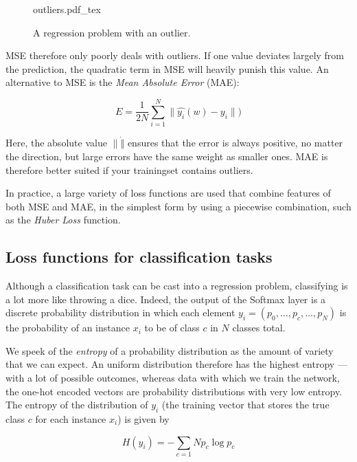 \begin{figure}[htb]
    \centering
    \def\svgwidth{0.5\textwidth}
    {outliers.pdf_tex}
    \caption{A regression problem with an outlier.\label{fig:outliers}}
\end{figure}

MSE therefore only poorly deals with outliers. If one value deviates largely from the prediction, the quadratic term in MSE will heavily punish this value. An alternative to MSE is the \emph{Mean Absolute Error} (MAE):

\begin{equation}
E=\frac{1}{2N}\sum_{i=1}^N\|\hat{y_i}(w)-y_i\|)
\end{equation}

Here, the absolute value $\|\dot\|$ ensures that the error is always positive, no matter the direction, but large errors have the same weight as smaller ones. MAE is therefore better suited if your trainingset contains outliers.

In practice, a large variety of loss functions are used that combine features of both MSE and MAE, in the simplest form by using a piecewise combination, such as the \emph{Huber Loss} function. 


\subsection{Loss functions for classification tasks}

Although a classification task can be cast into a regression problem, classifying is a lot more like throwing a dice. Indeed, the output of the Softmax layer is a discrete probability distribution in which each element $y_i=(p_0, \dots, p_c, \dots ,p_N)$ is the probability of an instance $x_i$ to be of class $c$ in $N$ classes total.

We speek of the \emph{entropy} of a probability distribution as the amount of variety that we can expect. An uniform distribution therefore has the highest entropy --- with a lot of possible outcomes, whereas data with which we train the network, the one-hot encoded vectors are probability distributions with very low entropy. The entropy of the distribution of $y_i$ (the training vector that stores the true class $c$ for each instance $x_i$) is given by 

\begin{equation}
H(y_i)=-\sum_{c=1}{N}p_c \log p_c
\end{equation}

